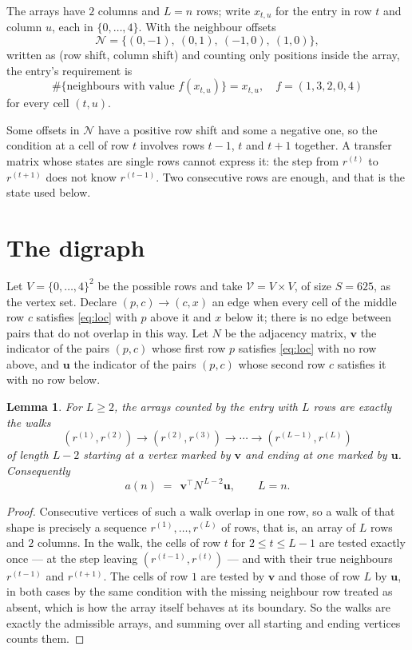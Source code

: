 \documentclass[11pt,a4paper]{article}
\theoremstyle{plain}
\newtheorem{lemma}[theorem]{Lemma}
\theoremstyle{definition}
\begin{document}
The arrays have $2$ columns and $L=n$ rows; write $x_{t,u}$ for the entry in
row $t$ and column $u$, each in $\{0,\dots,4\}$. With the neighbour offsets
\[
\mathcal N=\{(0,-1),\ (0,1),\ (-1,0),\ (1,0)\},
\]
written as (row shift, column shift) and counting only positions inside the array, the
entry's requirement is
\begin{equation}\label{eq:loc}
\#\{\text{neighbours with value }f(x_{t,u})\}=x_{t,u},\quad f=(1,3,2,0,4)
\end{equation}
for every cell $(t,u)$.

Some offsets in $\mathcal N$ have a positive row shift and some a negative one, so the
condition at a cell of row $t$ involves rows $t-1$, $t$ and $t+1$ together. A transfer
matrix whose states are single rows cannot express it: the step from $r^{(t)}$ to
$r^{(t+1)}$ does not know $r^{(t-1)}$. Two consecutive rows are enough, and that is
the state used below.

\section{The digraph}

Let $V=\{0,\dots,4\}^{2}$ be the possible rows and take
$\mathcal V=V\times V$, of size $S=625$, as the vertex set. Declare $(p,c)\to(c,x)$ an edge
when every cell of the middle row $c$ satisfies \eqref{eq:loc} with $p$ above it and $x$
below it; there is no edge between pairs that do not overlap in this way. Let $N$ be the
adjacency matrix, $\mathbf{v}$ the indicator of the pairs $(p,c)$ whose first row $p$
satisfies \eqref{eq:loc} with no row above, and $\mathbf{u}$ the indicator of
the pairs $(p,c)$ whose second row $c$ satisfies it with no row below.

\begin{lemma}\label{lem:walk}
For $L\ge2$, the arrays counted by the entry with $L$ rows are exactly the walks
\[
(r^{(1)},r^{(2)})\to(r^{(2)},r^{(3)})\to\cdots\to(r^{(L-1)},r^{(L)})
\]
of length $L-2$ starting at a vertex marked by $\mathbf{v}$ and ending at one marked by
$\mathbf{u}$. Consequently
\[
a(n)\;=\;\,\mathbf{v}^{\!\top}N^{\,L-2}\mathbf{u},\qquad L=n .
\]
\end{lemma}

\begin{proof}
Consecutive vertices of such a walk overlap in one row, so a walk of that shape is
precisely a sequence $r^{(1)},\dots,r^{(L)}$ of rows, that is, an array of $L$ rows
and $2$ columns. In the walk, the cells of row $t$ for $2\le t\le L-1$ are tested
exactly once --- at the step leaving $(r^{(t-1)},r^{(t)})$ --- and with their true
neighbours $r^{(t-1)}$ and $r^{(t+1)}$. The cells of row $1$ are tested by
$\mathbf{v}$ and those of row $L$ by $\mathbf{u}$, in both cases by the same condition
with the missing neighbour row treated as absent, which is how the array itself behaves at
its boundary. So the walks are exactly the admissible arrays, and summing over all starting
and ending vertices counts them.
\end{proof}
\end{document}
